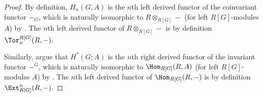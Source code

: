 \begin{proof}
    By definition, $H_n(G,A)$ is the $n$th left derived functor of the coinvariant functor $-_G$, which is naturally isomorphic to $R \otimes_{R[G]} -$ (for left $R[G]$-modules $A$) by . The $n$th left derived functor of $R \otimes_{R[G]} -$ is by definition $\Tor_n^{R[G]}(R,-)$. 

    Similarly, argue that $H^*(G;A)$ is the $n$th right derived functor of the invariant functor $-^G$, which is naturally isomorphic to $\Hom_{R[G]}(R, A)$ (for left $R[G]$-modules $A$) by . The $n$th left derived functor of $\Hom_{R[G]}(R, -)$ is by definition $\Ext^n_{R[G]}(R,-)$. 
\end{proof}